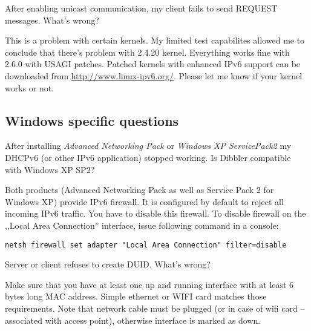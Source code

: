 \Q After enabling unicast communication, my client fails to send
REQUEST messages. What's wrong?

\A This is a problem with certain kernels. My limited test capabilites
allowed me to conclude that there's problem with 2.4.20
kernel. Everything works fine with 2.6.0 with USAGI patches. Patched 
kernels with enhanced IPv6 support can be downloaded from
\url{http://www.linux-ipv6.org/}. Please let me know if your kernel
works or not.

\subsection{Windows specific questions}

\Q After installing \emph{Advanced Networking Pack} or \emph{Windows XP
  ServicePack2} my DHCPv6 (or other IPv6 application) stopped
   working. Is Dibbler compatible with Windows XP SP2?

\A Both products (Advanced Networking Pack as well as Service Pack 2
for Windows XP) provide IPv6 firewall. It is configured by default to
reject all incoming IPv6 traffic. You have to disable this
firewall. To disable firewall on the ,,Local Area Connection''
interface, issue following command in a console:

\begin{verbatim}
netsh firewall set adapter "Local Area Connection" filter=disable
\end{verbatim}

\Q Server or client refuses to create DUID. What's wrong?

\A Make sure that you have at least one up and running interface with
at least 6 bytes long MAC address. Simple ethernet or WIFI card
matches those requirements. Note that network cable must be plugged
(or in case of wifi card -- associated with access point), otherwise
interface is marked as down.

